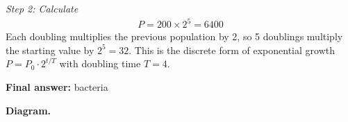 \documentclass[11pt]{article}
\begin{document}
\textit{Step 2: Calculate}
\[\begin{gathered}
P = 200 \times 2^5 = 6400
\end{gathered}\]
Each doubling multiplies the previous population by 2, so 5 doublings multiply the starting value by \( 2^5 = 32 \). This is the discrete form of exponential growth \( P = P_0 \cdot 2^{t/T} \) with doubling time \( T = 4 \).

\begin{answerbox}
\textbf{Final answer:} bacteria
\end{answerbox}
\textbf{Diagram.}

\begin{center}
\end{center}
\end{document}
